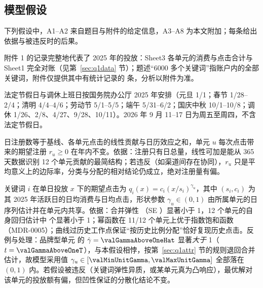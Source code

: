 \subsection{模型假设}
下列假设中，A1--A2 来自题目与附件的给定信息，A3--A8 为本文附加；每条给出依据与被违反时的后果。

\begin{assumption}[数据口径]\label{as:data}
附件 1 的记录完整地代表了 2025 年的投放：Sheet3 各单元的消费与点击合计与 Sheet1 完全对账（见第~\ref{sec:q1data} 节）；题述“6000 多个关键词”指账户内的全部关键词，附件仅提供其中有统计记录的 \valKeywordRows{} 条，分析以附件为准。
\end{assumption}

\begin{assumption}[节假日日历]\label{as:calendar}
法定节假日与调休上班日按国务院办公厅 2025 年安排\cite{gbf2024}（元旦 1/1；春节 1/28--2/4；清明 4/4--4/6；劳动节 5/1--5/5；端午 5/31--6/2；国庆中秋 10/1--10/8；调休 1/26、2/8、4/27、9/28、10/11）。2026 年 9 月 11--17 日为周五至周四，不含法定节假日。
\end{assumption}

\begin{assumption}[注册的线性可加归因]\label{as:attr}
日注册数等于基线、各单元点击的线性贡献与日历效应之和，单元 $u$ 每次点击带来的期望注册 $r_u\ge 0$ 在年内不变。依据：注册只有日总量，线性可加是能从 365 天数据识别 12 个单元贡献的最简结构；若违反（如渠道间存在协同），$r_u$ 只是平均意义上的边际率，分类与分配的相对结论仍成立，绝对注册量有偏。
\end{assumption}

\begin{assumption}[幂函数响应与单元共享弹性]\label{as:resp}
关键词 $i$ 在单日投放 $x$ 下的期望点击为 $q_i(x)=c_i(x/s_i)^{\gamma_u}$，其中 $(s_i,c_i)$ 为其 2025 年活跃日的日均消费与日均点击，形状参数 $\gamma_u\in(0,1)$ 由所属单元的日序列估计并在单元内共享。依据：合并弹性 \valPooledGamma（SE \valPooledGammaSe）显著小于 1，12 个单元的自身回归估计中 \valUnitsGammaHatBelowOne{} 个显著小于 1；幂函数在 11/12 个单元上优于指数饱和函数（MDR-0005）；曲线过历史工作点保证“按历史比例分配”恰好复现历史点击。反例与处理：品牌型单元 \valGammaAboveOneUnitId{} 的 $\hat\gamma=\valGammaAboveOneHat$ 显著\emph{大于} 1（$t=\valGammaAboveOneT$），与本假设相悖，按第~\ref{sec:q1attr} 节的规则退回合并估计，故模型采用值 $\gamma_u\in[\valMinUnitGamma,\valMaxUnitGamma]$ 全部落在 $(0,1)$ 内。若假设被违反（关键词弹性异质，或某单元真为凸响应），最优解对该单元的投放额有偏，但凹性保证的分散化结论不变。
\end{assumption}

